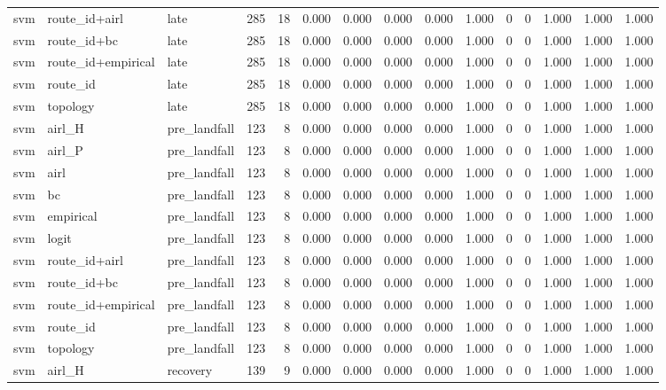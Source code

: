 \begin{tabular}{lllrrrrrrrrrrrr}
svm & route_id+airl & late & 285 & 18 & 0.000 & 0.000 & 0.000 & 0.000 & 1.000 & 0 & 0 & 1.000 & 1.000 & 1.000 \\
svm & route_id+bc & late & 285 & 18 & 0.000 & 0.000 & 0.000 & 0.000 & 1.000 & 0 & 0 & 1.000 & 1.000 & 1.000 \\
svm & route_id+empirical & late & 285 & 18 & 0.000 & 0.000 & 0.000 & 0.000 & 1.000 & 0 & 0 & 1.000 & 1.000 & 1.000 \\
svm & route_id & late & 285 & 18 & 0.000 & 0.000 & 0.000 & 0.000 & 1.000 & 0 & 0 & 1.000 & 1.000 & 1.000 \\
svm & topology & late & 285 & 18 & 0.000 & 0.000 & 0.000 & 0.000 & 1.000 & 0 & 0 & 1.000 & 1.000 & 1.000 \\
svm & airl_H & pre_landfall & 123 & 8 & 0.000 & 0.000 & 0.000 & 0.000 & 1.000 & 0 & 0 & 1.000 & 1.000 & 1.000 \\
svm & airl_P & pre_landfall & 123 & 8 & 0.000 & 0.000 & 0.000 & 0.000 & 1.000 & 0 & 0 & 1.000 & 1.000 & 1.000 \\
svm & airl & pre_landfall & 123 & 8 & 0.000 & 0.000 & 0.000 & 0.000 & 1.000 & 0 & 0 & 1.000 & 1.000 & 1.000 \\
svm & bc & pre_landfall & 123 & 8 & 0.000 & 0.000 & 0.000 & 0.000 & 1.000 & 0 & 0 & 1.000 & 1.000 & 1.000 \\
svm & empirical & pre_landfall & 123 & 8 & 0.000 & 0.000 & 0.000 & 0.000 & 1.000 & 0 & 0 & 1.000 & 1.000 & 1.000 \\
svm & logit & pre_landfall & 123 & 8 & 0.000 & 0.000 & 0.000 & 0.000 & 1.000 & 0 & 0 & 1.000 & 1.000 & 1.000 \\
svm & route_id+airl & pre_landfall & 123 & 8 & 0.000 & 0.000 & 0.000 & 0.000 & 1.000 & 0 & 0 & 1.000 & 1.000 & 1.000 \\
svm & route_id+bc & pre_landfall & 123 & 8 & 0.000 & 0.000 & 0.000 & 0.000 & 1.000 & 0 & 0 & 1.000 & 1.000 & 1.000 \\
svm & route_id+empirical & pre_landfall & 123 & 8 & 0.000 & 0.000 & 0.000 & 0.000 & 1.000 & 0 & 0 & 1.000 & 1.000 & 1.000 \\
svm & route_id & pre_landfall & 123 & 8 & 0.000 & 0.000 & 0.000 & 0.000 & 1.000 & 0 & 0 & 1.000 & 1.000 & 1.000 \\
svm & topology & pre_landfall & 123 & 8 & 0.000 & 0.000 & 0.000 & 0.000 & 1.000 & 0 & 0 & 1.000 & 1.000 & 1.000 \\
svm & airl_H & recovery & 139 & 9 & 0.000 & 0.000 & 0.000 & 0.000 & 1.000 & 0 & 0 & 1.000 & 1.000 & 1.000 \\

\end{tabular}
